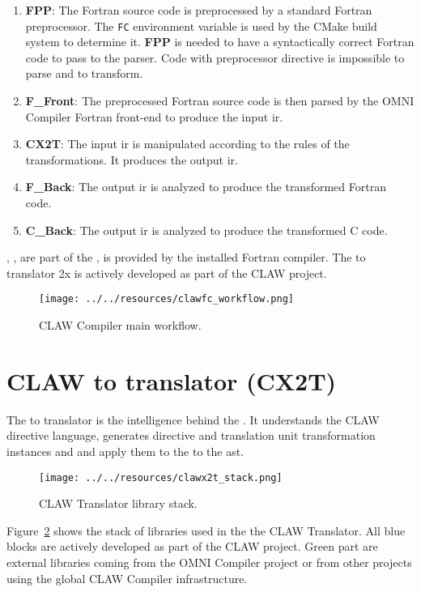 \begin{enumerate}
\item \textbf{FPP}: The Fortran source code is preprocessed by a standard
Fortran preprocessor.
The \lstinline|FC| environment variable is used by the CMake build system to
determine it. \textbf{FPP} is needed to have a syntactically correct Fortran
code to pass to the parser. Code with preprocessor directive is impossible
to parse and to transform.
\item \textbf{F\_Front}: The preprocessed Fortran source code is then parsed
by the OMNI Compiler Fortran front-end to produce the input \xcodemlf \gls{ir}.
\item \textbf{CX2T}: The input \xcodemlf \gls{ir} is manipulated according to
the rules of the transformations. It produces the output \xcodeml \gls{ir}.
\item \textbf{F\_Back}: The output \xcodemlf \gls{ir} is analyzed to produce
the transformed Fortran code.
\item \textbf{C\_Back}: The output \xcodemlc \gls{ir} is analyzed to produce
the transformed C code.
\end{enumerate}

\ffront{}, \fback{}, \cback{} are part of the \omni{}, \fpp{} is provided by the
installed Fortran compiler. The \xcodemlf to \xcodeml translator \cx2x{} is
actively developed as part of the CLAW project.

\begin{figure}[!ht]
  \centering
  \texttt{[image: ../../resources/clawfc\_workflow.png]} \\
  \caption{CLAW Compiler main workflow.}
  \label{fig:clawfc_main_workflow}
\end{figure}

\section{CLAW \xcodemlf to \xcodeml translator (CX2T)}
The \xcodemlf to \xcodeml translator is the intelligence behind the \clawfcomp.
It understands the CLAW directive language, generates directive and translation
unit transformation instances and and apply them to the to the \xcodeml
\gls{ast}.

\begin{figure}[!ht]
  \centering
  \texttt{[image: ../../resources/clawx2t\_stack.png]} \\
  \caption{CLAW \xcodemlf Translator library stack.}
  \label{fig:clawx2_stack}
\end{figure}

Figure~\ref{fig:clawx2_stack} shows the stack of libraries used in the the CLAW
\xcodemlf Translator. All blue blocks are actively developed as part of the CLAW
project. Green part are external libraries coming from the OMNI Compiler project
or from other projects using the global CLAW Compiler infrastructure.
